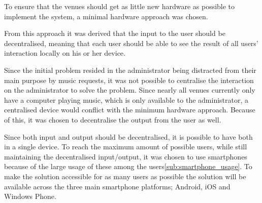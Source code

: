 To ensure that the venues should get as little new hardware as possible to implement the system, a minimal hardware approach was chosen.

From this approach it was derived that the input to the user should be decentralised, meaning that each user should be able to see the result of all users' interaction locally on his or her device.

Since the initial problem resided in the administrator being distracted from their main purpose by music requests, it was not possible to centralise the interaction on the administrator to solve the problem. Since nearly all venues currently only have a computer playing music, which is only available to the administrator, a centralised device would conflict with the minimum hardware approach. Because of this, it was chosen to decentralise the output from the user as well.

Since both input and output should be decentralised, it is possible to have both in a single device.
To reach the maximum amount of possible users, while still maintaining the decentralised input/output, it was chosen to use smartphones because of the large usage of these among the users\cref{sub:smartphone_usage}. To make the solution accessible for as many users as possible the solution will be available across the three main smartphone platforms; Android, iOS and Windows Phone.
